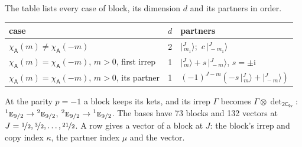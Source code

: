 \documentclass[10pt,a4paper]{article}
\numberwithin{equation}{section}
\newcommand{\grp}[1]{\mathsf{#1}}
\newcommand{\irr}[1]{\text{\normalfont\scshape #1}}
\newcommand{\conjpair}[1]{{}^{#1}}
\newcommand{\iunit}{\mathrm{i}}
\newcommand{\chiA}{\chi_{\grp{A}}}
\newcommand{\irrprod}{\otimes}
\newcommand{\mult}{\kappa}
\newcommand{\intx}{\mu}
\newcommand{\jm}[2]{\bigl\lvert{}^{#1}_{\,#2}\bigr\rangle}
\begin{document}
\leavevmode\label{n:head.case}\label{n:head.partners}The table lists every case of block, its dimension $d$ and its partners in order.
\begin{center}\begin{tabular}{@{}lrl@{}}\toprule
case & $d$ & partners\\\midrule
$\chiA(m) \ne \chiA(-m)$ & 2 & $\jm{J}{m_1}$;\ $c\,\jm{J}{-m_1}$\\
$\chiA(m) = \chiA(-m)$, $m > 0$, first irrep & 1 & $\jm{J}{m} + s\,\jm{J}{-m}$, $s = \pm\iunit$\\
$\chiA(m) = \chiA(-m)$, $m > 0$, its partner & 1 & $(-1)^{J-m}(-s\,\jm{J}{m} + \jm{J}{-m})$\\
\bottomrule\end{tabular}\end{center}
\leavevmode\label{n:operator.determinant.character}At the parity $p = -1$ a block keeps its kets, and its irrep $\Gamma$ becomes $\Gamma \irrprod \det_{\grp{2C_{9v}}}$: $\conjpair{1}\irr{e}_{9/2} \to \conjpair{2}\irr{e}_{9/2}$, $\conjpair{2}\irr{e}_{9/2} \to \conjpair{1}\irr{e}_{9/2}$.
The bases have 73 blocks and 132 vectors at $J = \nicefrac{1}{2}, \nicefrac{3}{2}, \dots, \nicefrac{21}{2}$. \label{n:head.vector}A row gives a vector of a block at $J$: the block's irrep and copy index $\mult$, the partner index $\intx$ and the vector.
\end{document}
